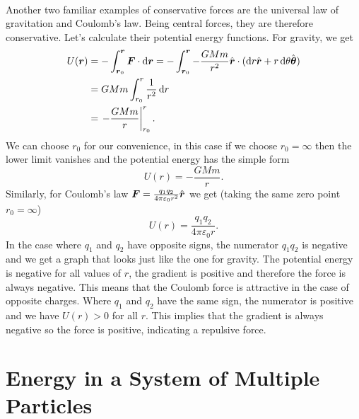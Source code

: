 \documentclass[../classical_mechanics.tex]{subfiles}
\begin{document}
        \paragraph{}
        Another two familiar examples of conservative forces are the universal law of gravitation and Coulomb's law.
        Being central forces, they are therefore conservative.
        Let's calculate their potential energy functions.
        For gravity, we get
        \begin{align}
            U(\vec{r})&=-\int_{\vec{r}_0}^{\vec{r}}\vec{F}\cdot\dd{\vec{r}}=-\int_{\vec{r}_0}^{\vec{r}}-\frac{GMm}{r^2}\uvec{r}\cdot(\dd{r}\uvec{r}+r\dd{\theta}\uvec{\theta})\\
            &=GMm\int_{r_0}^{r}\frac{1}{r^2}\dd{r}\\
            &=\left.-\frac{GMm}{r}\right|_{r_0}^{r}.
        \end{align}
        We can choose $r_0$ for our convenience, in this case if we choose $r_0=\infty$ then the lower limit vanishes and the potential energy has the simple form
        \begin{equation}
            U(r)=-\frac{GMm}{r}.
        \end{equation}
        Similarly, for Coulomb's law $\boldsymbol{F}=\frac{q_1q_2}{4\pi\varepsilon_0r^2}\hat{\boldsymbol{r}}$ we get (taking the same zero point $r_0=\infty$)
        \begin{equation}
            U(r)=\frac{q_1q_2}{4\pi\varepsilon_0r}.
        \end{equation}
        In the case where $q_1$ and $q_2$ have opposite signs, the numerator $q_1q_2$ is negative and we get a graph that looks just like the one for gravity.
        The potential energy is negative for all values of $r$, the gradient is positive and therefore the force is always negative.
        This means that the Coulomb force is attractive in the case of opposite charges.
        Where $q_1$ and $q_2$ have the same sign, the numerator is positive and we have $U(r)>0$ for all $r$.
        This implies that the gradient is always negative so the force is positive, indicating a repulsive force.

    \section{Energy in a System of Multiple Particles}\label{sec:energy-in-a-system-of-multiple-particles}
\end{document}
